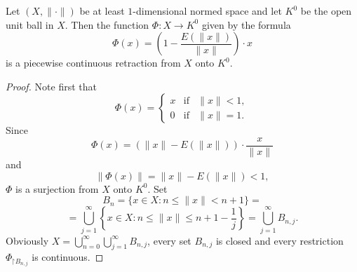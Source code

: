 \documentclass[10pt,a4paper]{amsart}
\newcommand\cn{\colon}
\newcommand\mn{\leqslant}
\newcommand\restr{\mathord{\restriction}}
\begin{document}
\begin{Th}
Let $(X,\|\cdot\|)$ be at least $1$-dimensional normed space and let $K^0$ be the open unit ball in $X$.
Then the function $\Phi\cn X\to K^0$ given by the formula
$$
\Phi(x)=\left(1-\frac{E(\|x\|)}{\|x\|}\right)\cdot x
$$
is a piecewise continuous retraction from $X$ onto $K^0$.
\end{Th}

\begin{proof}
Note first that
$$
\Phi(x)=\left\{\begin{array}{lll}
x & \textrm{if} & \|x\|<1,\\
0 & \textrm{if} & \|x\|=1.
\end{array} \right.
$$
Since
$$\Phi(x)=(\|x\|-E(\|x\|))\cdot\frac{x}{\|x\|}$$
and 
$$\|\Phi(x)\|=\|x\|-E(\|x\|)<1,$$
 $\Phi$ is a surjection from $X$ onto $K^0$. Set
$$
B_n=\{x\in X:n\mn\|x\|<n+1\}=
$$
$$
=\bigcup_{j=1}^\infty\left\{x\in X:n\mn\|x\|\mn n+1-\frac{1}{j}\right\}=\bigcup_{j=1}^\infty B_{n,j}.
$$
Obviously $X=\bigcup\limits_{n=0}^\infty\bigcup\limits_{j=1}^\infty B_{n,j}$, every set $B_{n,j}$ is closed and every restriction $\Phi_{\restr B_{n,j}}$ is continuous.
\end{proof}
\end{document}
